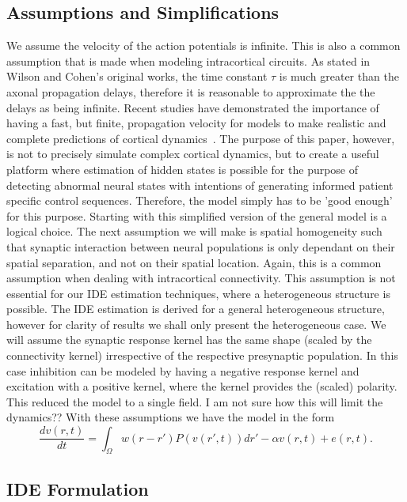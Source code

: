 \documentclass[onecolumn,draftcls]{IEEEtran}
\begin{document}
\subsection{Assumptions and Simplifications}
We assume the velocity of the action potentials is infinite. This is also a common assumption that is made when modeling intracortical circuits. As stated in Wilson and Cohen's original works, the time constant $\tau$ is much greater than the axonal propagation delays, therefore it is reasonable to approximate the the delays as being infinite. Recent studies have demonstrated the importance of having a fast, but finite, propagation velocity for models to make realistic and complete predictions of cortical dynamics~\cite{Atay2005}. The purpose of this paper, however, is not to precisely simulate complex cortical dynamics, but to create a useful platform where estimation of hidden states is possible for the purpose of detecting abnormal neural states with intentions of generating informed patient specific control sequences. Therefore, the model simply has to be 'good enough' for this purpose. Starting with this simplified version of the general model is a logical choice. The next assumption we will make is spatial homogeneity such that synaptic interaction between neural populations is only dependant on their spatial separation, and not on their spatial location. Again, this is a common assumption when dealing with intracortical connectivity. This assumption is not essential for our IDE estimation techniques, where a heterogeneous structure is possible. The IDE estimation is derived for a general heterogeneous structure, however for clarity of results we shall only present the heterogeneous case. We will assume the synaptic response kernel has the same shape (scaled by the connectivity kernel) irrespective of the respective presynaptic population. In this case inhibition can be modeled by having a negative response kernel and excitation with a positive kernel, where the kernel provides the (scaled) polarity. This reduced the model to a single field. I am not sure how this will limit the dynamics??
With these assumptions we have the model in the form
\begin{equation}\label{SimplifiedModel}
\frac{{dv\left( {r,t} \right)}}{{dt}} = \int_\Omega  {w\left( {r-r'} \right)P\left( {v\left( {r',t} \right)} \right)dr'}  - \alpha{v\left( {r,t} \right)} + e\left( {r,t} \right).
\end{equation}

\subsection{IDE Formulation}
\end{document}
